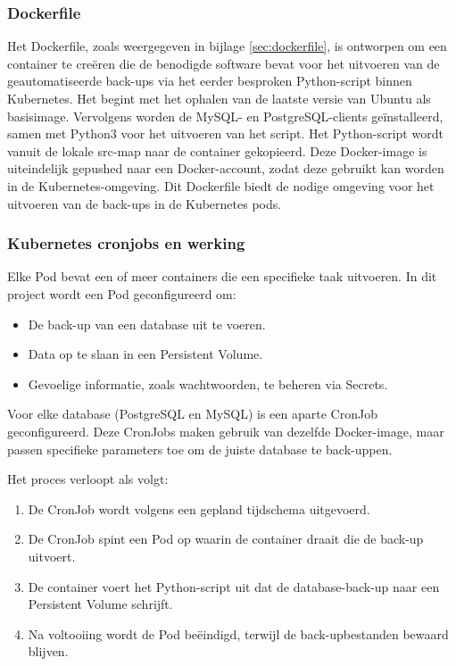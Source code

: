 \subsubsection{Dockerfile}
Het Dockerfile, zoals weergegeven in bijlage \ref{sec:dockerfile}, is ontworpen om een container te creëren die de benodigde software bevat voor het uitvoeren van de geautomatiseerde back-ups via het eerder besproken Python-script binnen Kubernetes. Het begint met het ophalen van de laatste versie van Ubuntu als basisimage. Vervolgens worden de MySQL- en PostgreSQL-clients geïnstalleerd, samen met Python3 voor het uitvoeren van het script. Het Python-script wordt vanuit de lokale src-map naar de container gekopieerd. Deze Docker-image is uiteindelijk gepushed naar een Docker-account, zodat deze gebruikt kan worden in de Kubernetes-omgeving. Dit Dockerfile biedt de nodige omgeving voor het uitvoeren van de back-ups in de Kubernetes pods.


\subsubsection{Kubernetes cronjobs en werking}
Elke Pod bevat een of meer containers die een specifieke taak uitvoeren. In dit project wordt een Pod geconfigureerd om:
\begin{itemize}
    \item De back-up van een database uit te voeren.
    \item Data op te slaan in een Persistent Volume.
    \item Gevoelige informatie, zoals wachtwoorden, te beheren via Secrets.
\end{itemize}

Voor elke database (PostgreSQL en MySQL) is een aparte CronJob geconfigureerd. Deze CronJobs maken gebruik van dezelfde Docker-image, maar passen specifieke parameters toe om de juiste database te back-uppen.

Het proces verloopt als volgt:
\begin{enumerate}
    \item De CronJob wordt volgens een gepland tijdschema uitgevoerd.
    \item De CronJob spint een Pod op waarin de container draait die de back-up uitvoert.
    \item De container voert het Python-script uit dat de database-back-up naar een Persistent Volume schrijft.
    \item Na voltooiing wordt de Pod beëindigd, terwijl de back-upbestanden bewaard blijven.
\end{enumerate}

